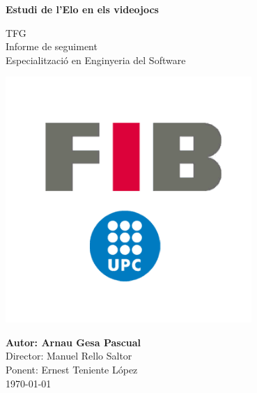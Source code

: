 \begin{titlepage}
    \begin{center}
        \vspace*{1cm}
            
        \Huge
        \textbf{Estudi de l'Elo en els videojocs}
            
        \vspace{0.5cm}
        \Large
        TFG\\
        Informe de seguiment\\
        Especialització en Enginyeria del Software
            
        \vspace{0.7cm}
            
        \includegraphics[width=0.7\textwidth]{images/logo-fib.png}
            
        \vfill
        \Large
        \textbf{Autor: Arnau Gesa Pascual}\\
        Director: Manuel Rello Saltor\\
        Ponent: Ernest Teniente López\\
        \today\\
            
    \end{center}
\end{titlepage}